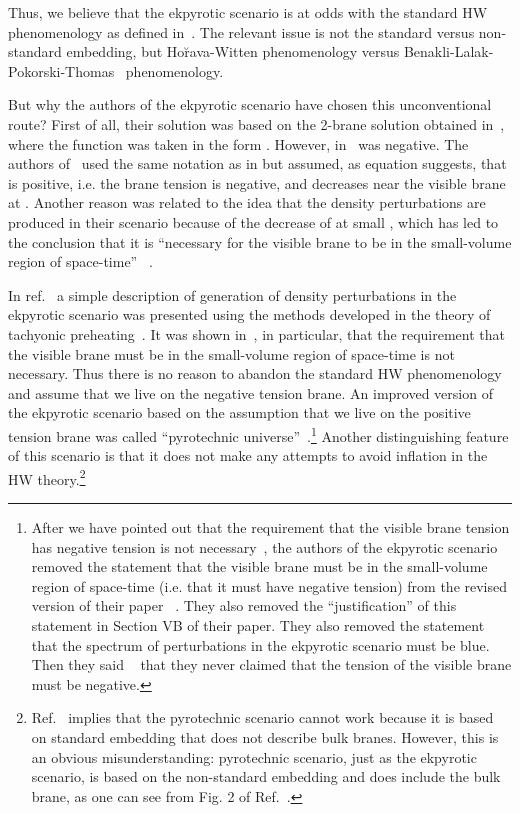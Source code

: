 \documentclass[a4paper,12pt]{article}
\begin{document}
 
Thus, we believe that the ekpyrotic scenario is at odds with the standard HW phenomenology as defined in~\cite{HoravaWitten}. The relevant issue is not the standard versus non-standard embedding,  but Ho\u{r}ava-Witten phenomenology \cite{HoravaWitten} versus   
Benakli-Lalak-Pokorski-Thomas~\cite{Benakli:1999sy} phenomenology.

But why the authors of the ekpyrotic scenario have chosen  this unconventional route? First of all, their solution was based on the 2-brane solution obtained in~\cite{universe}, where the
function \coordHE{} was taken in the form \coordHE{}. However, in~\cite{universe} \myHighlight{$\alpha$}\coordHE{} was negative.  The authors of~\cite{KOST} used the same notation as in \cite{universe} but assumed, as equation \coordHE{} suggests, that  \myHighlight{$\alpha$}\coordHE{} is positive, i.e. the brane tension  is negative,  and \coordHE{} decreases near the visible brane at \coordHE{}. Another reason was related to the idea that the density perturbations are produced in their scenario because of the decrease of \coordHE{} at small \coordHE{}, which has led to the conclusion that it is  ``necessary  for the visible brane to be in the small-volume region of space-time'' ~\cite{KOST}.  

In ref.~\cite{KKL} a  simple description of generation of density   
perturbations in the ekpyrotic scenario was presented using the methods developed in the theory of   
tachyonic preheating~\cite{tach}. It was  shown in~\cite{KKL}, in   
particular, that the requirement that the visible brane must be in the   
small-volume region of space-time is not necessary. Thus there is no   
reason to abandon the standard HW phenomenology and assume that we live on   
the negative tension brane. An improved version of the ekpyrotic scenario   
based on the assumption that we live on the positive tension brane was   
called   ``pyrotechnic universe''~\cite{KKL}.\footnote{
After we have pointed out that the requirement that the visible brane tension has negative tension is not necessary~\cite{KKL}, the authors of the ekpyrotic scenario  removed the statement that the visible brane must be in the small-volume region of space-time (i.e. that it must have negative tension) from the revised version of their paper ~\cite{KOST}. They also removed  the ``justification'' of this statement in Section VB of their paper. They also removed the statement that the spectrum of perturbations in the ekpyrotic scenario must be blue.  Then they said ~\cite{Khoury:2001iy} that they never claimed that the tension of the visible brane must be negative. }  Another distinguishing feature of this scenario is that it does not make any attempts to avoid inflation in the HW theory.\footnote{Ref.~\cite{Khoury:2001iy} implies that the pyrotechnic scenario cannot work because it is based on standard embedding that does not describe bulk branes. However, this is an obvious misunderstanding: pyrotechnic scenario, just as the ekpyrotic scenario, is based on the non-standard embedding and does include the bulk brane, as one can see from Fig. 2 of Ref.~\cite{KKL}.}
\end{document}

